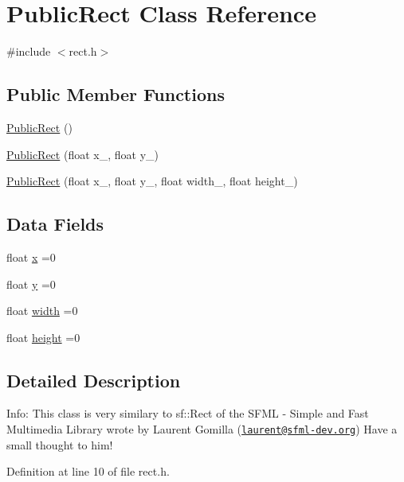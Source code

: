 \hypertarget{class_public_rect}{\section{Public\-Rect Class Reference}
\label{class_public_rect}
}


{\ttfamily \#include $<$rect.\-h$>$}

\subsection*{Public Member Functions}
\begin{DoxyCompactItemize}
\item 
\hyperlink{class_public_rect_af1b2a63089d11f607be5d0d912a50058}{Public\-Rect} ()
\item 
\hyperlink{class_public_rect_a4d664fdbc671fc4e3f1784d94687ed41}{Public\-Rect} (float x\-\_\-, float y\-\_\-)
\item 
\hyperlink{class_public_rect_a18365da833d896524b9d68f720154df2}{Public\-Rect} (float x\-\_\-, float y\-\_\-, float width\-\_\-, float height\-\_\-)
\end{DoxyCompactItemize}
\subsection*{Data Fields}
\begin{DoxyCompactItemize}
\item 
float \hyperlink{class_public_rect_a9b85ada3510a3d217471cd93f699624b}{x} =0
\item 
float \hyperlink{class_public_rect_ab37db90962870ddf84b7f8fbd62ab2ad}{y} =0
\item 
float \hyperlink{class_public_rect_ad9e87b1af7b2c11f35afaea9bd267871}{width} =0
\item 
float \hyperlink{class_public_rect_a9c2aef279c900310d3d0c8a351b7332f}{height} =0
\end{DoxyCompactItemize}


\subsection{Detailed Description}
Info\-: This class is very similary to sf\-::\-Rect of the S\-F\-M\-L -\/ Simple and Fast Multimedia Library wrote by Laurent Gomilla (\href{mailto:laurent@sfml-dev.org}{\tt laurent@sfml-\/dev.\-org}) Have a small thought to him! 

Definition at line 10 of file rect.\-h.



